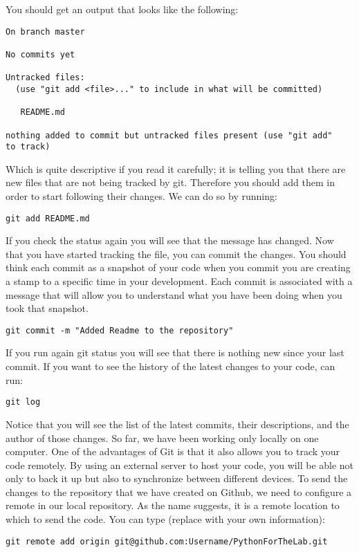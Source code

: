 You should get an output that looks like the following:
\begin{verbatim}
On branch master

No commits yet

Untracked files:
  (use "git add <file>..." to include in what will be committed)

   README.md

nothing added to commit but untracked files present (use "git add" 
to track) 
\end{verbatim}

Which is quite descriptive if you read it carefully; it is telling you that there are new files that are not being tracked by git. Therefore you should add them in order to start following their changes. We can do so by running:
\begin{verbatim}
git add README.md 
\end{verbatim}

If you check the status again you will see that the message has changed. Now that you have started tracking the file, you can commit the changes. You should think each commit as a snapshot of your code when you commit you are creating a stamp to a specific time in your development. Each commit is associated with a message that will allow you to understand what you have been doing when you took that snapshot.
\begin{verbatim}
git commit -m "Added Readme to the repository" 
\end{verbatim}

If you run again git status you will see that there is nothing new since your last commit. If you want to see the history of the latest changes to your code, can run:
\begin{verbatim}
git log 
\end{verbatim}

Notice that you will see the list of the latest commits, their descriptions, and the author of those changes. So far, we have been working only locally on one computer. One of the advantages of Git is that it also allows you to track your code remotely. By using an external server to host your code, you will be able not only to back it up but also to synchronize between different devices. To send the changes to the repository that we have created on Github, we need to configure a remote in our local repository. As the name suggests, it is a remote location to which to send the code. You can type (replace with your own information):
\begin{verbatim}
git remote add origin git@github.com:Username/PythonForTheLab.git
\end{verbatim}

